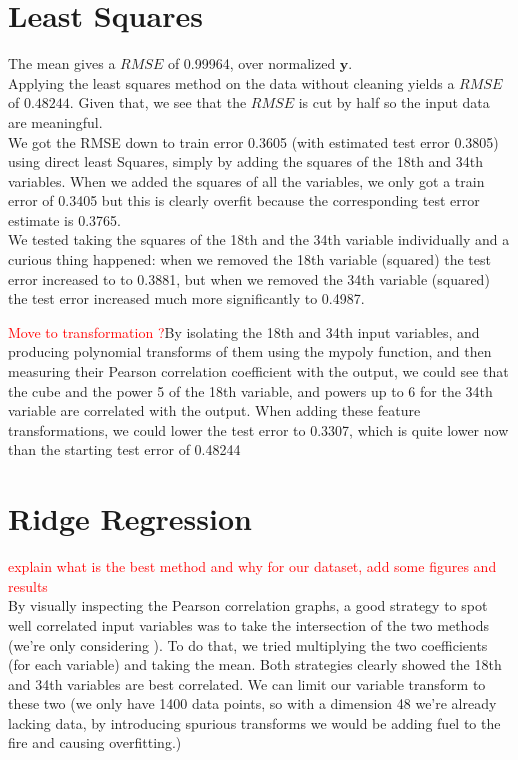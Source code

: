 \documentclass{article} %
\begin{document}
\section{Least Squares}
The mean gives a $RMSE$ of 0.99964, over normalized $\mathbf{y}$.\\

Applying the least squares method on the data without cleaning yields a $RMSE$ of $0.48244$. Given that, we see that the $RMSE$ is cut by half so the input data are meaningful.
\\

We got the RMSE down to train error 0.3605 (with estimated test error 0.3805) using direct least Squares, simply by adding the squares of the 18th and 34th variables. When we added the squares of all the variables, we only got a train error of 0.3405 but this is clearly overfit because the corresponding test error estimate is 0.3765.\\

We tested taking the squares of the 18th and the 34th variable individually and a curious thing happened: when we removed the 18th variable (squared) the test error increased to to 0.3881, but when we removed the 34th variable (squared) the test error increased much more significantly to 0.4987.

\textcolor{red}{Move to transformation ?}By isolating the 18th and 34th input variables, and producing polynomial transforms of them using the mypoly function, and then measuring their Pearson correlation coefficient with the output, we could see that the cube and the power 5 of the 18th variable, and powers up to 6 for the 34th variable are correlated with the output. When adding these feature transformations, we could lower the test error to 0.3307, which is quite lower now than the starting test error of 0.48244
\section{Ridge Regression}
\textcolor{red}{explain what is the best method and why for our dataset, add some figures and results}\\

By visually inspecting the Pearson correlation graphs, a good strategy to spot well correlated input variables was to take the intersection of the two methods (we’re only considering ). To do that, we tried multiplying the two coefficients (for each variable) and taking the mean. Both strategies clearly showed the 18th and 34th variables are best correlated. We can limit our variable transform to these two (we only have 1400 data points, so with a dimension 48 we’re already lacking data, by introducing spurious transforms we would be adding fuel to the fire and causing overfitting.)
\end{document}
